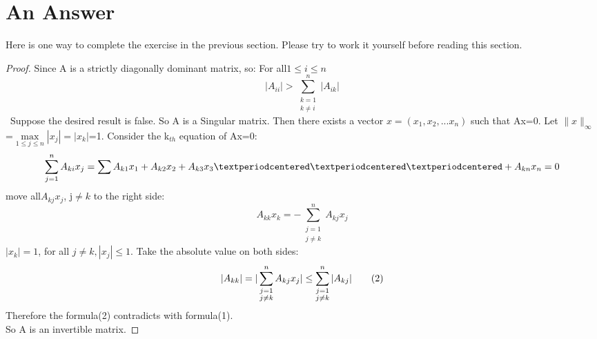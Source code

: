 \documentclass[]{article}
\begin{document}
	\section{An Answer}
	Here is one way to complete the exercise in the previous section. Please try to work it yourself before reading this section.\\ 
	\begin{proof}
		Since A is a strictly diagonally dominant matrix, so: For all\(1\leq i\leq n\)\[
		\vert A_{ii}\vert>\sum_{\substack {k=1 \\ k\neq i}}^{n}\vert A_{ik}\vert\tag{1}
		\]\
		Suppose the desired result is false. So A is a Singular matrix. Then there exists a vector \(x=(x_1, x_2, ...x_n)\) such that Ax=0. Let $\lVert x \rVert_\infty$ =\(\underset{1\leq j\leq n}\max |x_j|=|x_k|\)=1. Consider the k\(_{th}\) equation of Ax=0:\\
		\[
		\sum_{j=1}^{n}A_{ki}x_j=\sum A_{k1}x_1+A_{k2}x_2+A_{k3}x_3···+A_{kn}x_n=0\\
		\]
		move all\(A_{kj}x_j\), j$\neq k$ to the right side:
		\[
		A_{kk}x_k=-\sum_{\substack {j=1 \\ j\neq k}}^nA_{kj}x_j
		\]
		$|x_k|=1$, for all $ j\neq k, |x_j|\leq 1$. Take the absolute value on both sides:
		\[
		\vert A_{kk}\vert=\vert\sum_{\substack {j=1 \\ j\neq k}}^nA_{kj}x_j\vert\leq\sum_{\substack {j=1 \\ j\neq k}}^n|A_{kj}|\tag{2}
		\\
		\]
		Therefore the formula(2) contradicts with formula(1).\\
		So A is an invertible matrix.
	\end{proof}
\end{document}
